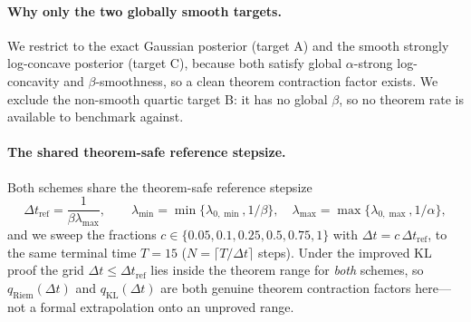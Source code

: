 \documentclass[11pt]{article}
\begin{document}
\paragraph{Why only the two globally smooth targets.}
We restrict to the exact Gaussian posterior (target A) and the smooth strongly
log-concave posterior (target C), because both satisfy global $\alpha$-strong
log-concavity and $\beta$-smoothness, so a clean theorem contraction factor
exists. We exclude the non-smooth quartic target B: it has no global $\beta$, so
no theorem rate is available to benchmark against.

\paragraph{The shared theorem-safe reference stepsize.}
Both schemes share the theorem-safe reference stepsize
\begin{equation}\label{eq:dtref}
\Delta t_{\mathrm{ref}}=\frac1{\beta\lambda_{\max}},
\qquad
\lambda_{\min}=\min\{\lambda_{0,\min},1/\beta\},
\quad
\lambda_{\max}=\max\{\lambda_{0,\max},1/\alpha\},
\end{equation}
and we sweep the fractions
$c\in\{0.05,0.1,0.25,0.5,0.75,1\}$ with $\Delta t=c\,\Delta t_{\mathrm{ref}}$, to
the same terminal time $T=15$ ($N=\lceil T/\Delta t\rceil$ steps). Under the
improved KL proof the grid $\Delta t\le\Delta t_{\mathrm{ref}}$ lies inside the
theorem range for \emph{both} schemes, so $q_{\mathrm{Riem}}(\Delta t)$ and
$q_{\mathrm{KL}}(\Delta t)$ are both genuine theorem contraction factors here---not
a formal extrapolation onto an unproved range.
\end{document}

